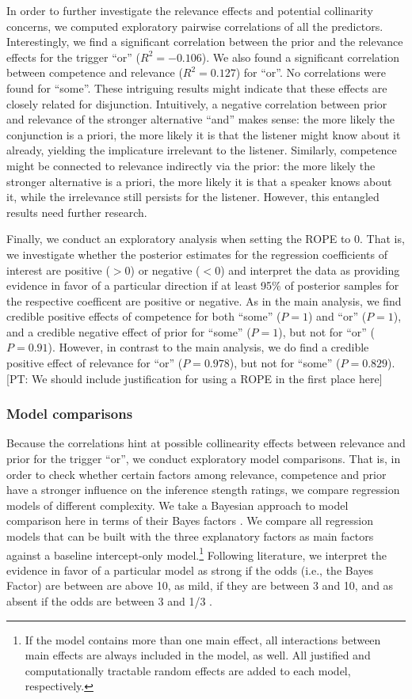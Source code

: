 \documentclass{sp}
\newcommand{\pt}[1]{\textcolor{Cerulean}{[PT: #1]}}
\begin{document}
In order to further investigate the relevance effects and potential collinarity concerns, we computed exploratory pairwise correlations of all the predictors. Interestingly, we find a significant correlation between the prior and the relevance effects for the trigger ``or'' ($R^2 = -0.106$). We also found a significant correlation between competence and relevance ($R^2 = 0.127$) for ``or''. No correlations were found for ``some''. These intriguing results might indicate that these effects are closely related for disjunction. Intuitively, a negative correlation between prior and relevance of the stronger alternative ``and'' makes sense: the more likely the conjunction is a priori, the more likely it is that the listener might know about it already, yielding the implicature irrelevant to the listener. Similarly, competence might be connected to relevance indirectly via the prior: the more likely the stronger alternative is a priori, the more likely it is that a speaker knows about it, while the irrelevance still persists for the listener. However, this entangled results need further research.

Finally, we conduct an exploratory analysis when setting the ROPE to 0. That is, we investigate whether the posterior estimates for the regression coefficients of interest are positive ($>0$) or negative ($<0$) and interpret the data as providing evidence in favor of a particular direction if at least 95\% of posterior samples for the respective coefficent are positive or negative. As in the main analysis, we find credible positive effects of competence for both ``some'' ($P = 1$) and ``or'' ($P = 1$), and a credible negative effect of prior for ``some'' ($P = 1$), but not for ``or'' ($P=0.91$). However, in contrast to the main analysis, we do find a credible positive effect of relevance for ``or'' ($P=0.978$), but not for ``some'' ($P=0.829$). \pt{We should include justification for using a ROPE in the first place here} 

\subsubsection{Model comparisons}
Because the correlations hint at possible collinearity effects between relevance and prior for the trigger ``or'', we conduct exploratory model comparisons. That is, in order to check whether certain factors among relevance, competence and prior have a stronger influence on the inference stength ratings, we compare regression models of different complexity. We take a Bayesian approach to model comparison here in terms of their Bayes factors \citep{rouder2012default}. 
We compare all regression models that can be built with the three explanatory factors as main factors against a baseline intercept-only model.\footnote{If the model contains more than one main effect, all interactions between main effects are always included in the model, as well. All justified and computationally tractable random effects are added to each model, respectively.}
Following literature, we interpret the evidence in favor of a particular model as strong if the odds (i.e., the Bayes Factor) are between are above 10, as mild, if they are between 3 and 10, and as absent if the odds are between 3 and 1/3 \citep[e.g.,][]{lodewyckx2011tutorial}. 
\end{document}
